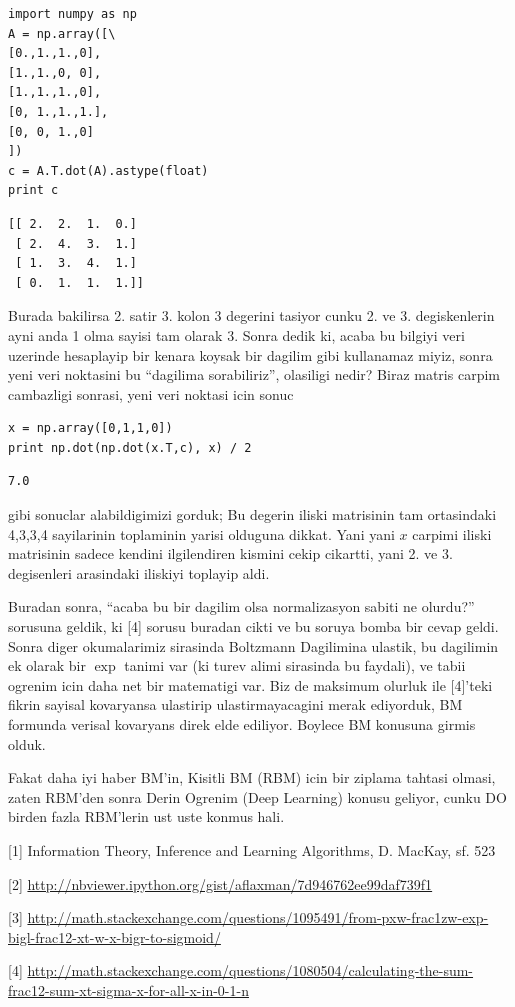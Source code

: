 \documentclass[12pt,fleqn]{article}\usepackage{../common}
\begin{document}
\begin{verbatim}
import numpy as np
A = np.array([\
[0.,1.,1.,0],
[1.,1.,0, 0],
[1.,1.,1.,0],
[0, 1.,1.,1.],
[0, 0, 1.,0]
])
c = A.T.dot(A).astype(float)
print c 
\end{verbatim}

\begin{verbatim}
[[ 2.  2.  1.  0.]
 [ 2.  4.  3.  1.]
 [ 1.  3.  4.  1.]
 [ 0.  1.  1.  1.]]
\end{verbatim}

Burada bakilirsa 2. satir 3. kolon 3 degerini tasiyor cunku 2. ve
3. degiskenlerin ayni anda 1 olma sayisi tam olarak 3. Sonra dedik ki,
acaba bu bilgiyi veri uzerinde hesaplayip bir kenara koysak bir dagilim
gibi kullanamaz miyiz, sonra yeni veri noktasini bu ``dagilima sorabiliriz'',
olasiligi nedir? Biraz matris carpim cambazligi sonrasi, yeni veri
noktasi icin sonuc

\begin{verbatim}
x = np.array([0,1,1,0])
print np.dot(np.dot(x.T,c), x) / 2
\end{verbatim}

\begin{verbatim}
7.0
\end{verbatim}

gibi sonuclar alabildigimizi gorduk; Bu degerin iliski matrisinin tam
ortasindaki 4,3,3,4 sayilarinin toplaminin yarisi olduguna dikkat. Yani
yani $x$ carpimi iliski matrisinin sadece kendini ilgilendiren kismini
cekip cikartti, yani 2. ve 3. degisenleri arasindaki iliskiyi toplayip
aldi. 

Buradan sonra, ``acaba bu bir dagilim olsa normalizasyon sabiti ne
olurdu?'' sorusuna geldik, ki [4] sorusu buradan cikti ve bu soruya bomba
bir cevap geldi. Sonra diger okumalarimiz sirasinda Boltzmann Dagilimina
ulastik, bu dagilimin ek olarak bir $\exp$ tanimi var (ki turev alimi
sirasinda bu faydali), ve tabii ogrenim icin daha net bir matematigi
var. Biz de maksimum olurluk ile [4]'teki fikrin sayisal kovaryansa
ulastirip ulastirmayacagini merak ediyorduk, BM formunda verisal kovaryans
direk elde ediliyor. Boylece BM konusuna girmis olduk. 

Fakat daha iyi haber BM'in, Kisitli BM (RBM) icin bir ziplama tahtasi
olmasi, zaten RBM'den sonra Derin Ogrenim (Deep Learning) konusu geliyor,
cunku DO birden fazla RBM'lerin ust uste konmus hali. 

[1] Information Theory, Inference and Learning Algorithms, D. MacKay, sf. 523

[2] \url{http://nbviewer.ipython.org/gist/aflaxman/7d946762ee99daf739f1}

[3] \url{http://math.stackexchange.com/questions/1095491/from-pxw-frac1zw-exp-bigl-frac12-xt-w-x-bigr-to-sigmoid/}

[4] \url{http://math.stackexchange.com/questions/1080504/calculating-the-sum-frac12-sum-xt-sigma-x-for-all-x-in-0-1-n}
\end{document}
